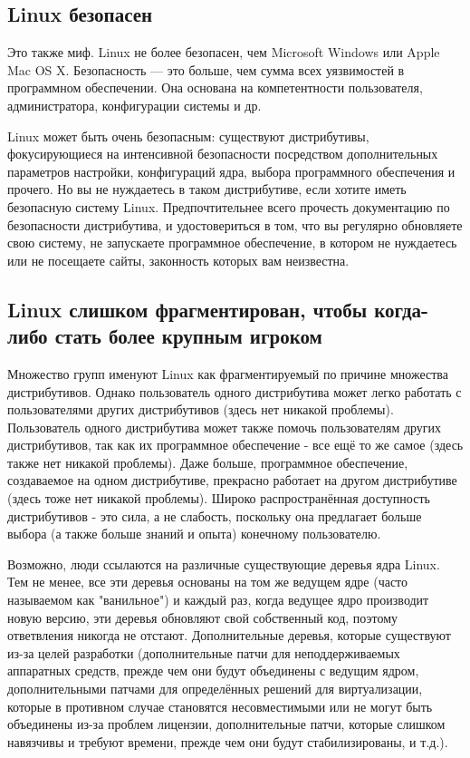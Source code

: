 \documentclass[12pt]{book}
\begin{document}
\subsection{Linux безопасен}

Это также миф. Linux не более безопасен, чем Microsoft Windows или Apple Mac OS X. Безопасность — это больше, чем сумма всех уязвимостей в программном обеспечении. Она основана на компетентности пользователя, администратора, конфигурации системы и др.

Linux может быть очень безопасным: существуют дистрибутивы,  фокусирующиеся на интенсивной безопасности посредством дополнительных параметров настройки, конфигураций ядра, выбора программного обеспечения и прочего. Но вы не нуждаетесь в таком дистрибутиве, если хотите иметь безопасную систему Linux. Предпочтительнее всего прочесть документацию по безопасности дистрибутива, и удостовериться в том, что вы регулярно обновляете свою систему, не запускаете программное обеспечение, в котором не нуждаетесь или не посещаете сайты, законность которых вам неизвестна.

\subsection{Linux слишком фрагментирован, чтобы когда-либо стать более крупным игроком}

Множество групп именуют Linux как фрагментируемый по причине множества дистрибутивов. Однако пользователь одного дистрибутива может легко работать с пользователями других дистрибутивов (здесь нет никакой проблемы). Пользователь одного дистрибутива может также помочь пользователям других дистрибутивов, так как их программное обеспечение - все ещё то же самое (здесь также нет никакой проблемы). Даже больше, программное обеспечение, создаваемое на одном дистрибутиве, прекрасно работает на другом дистрибутиве (здесь тоже нет никакой проблемы). Широко распространённая доступность дистрибутивов - это сила, а не слабость, поскольку она предлагает больше выбора (а также больше знаний и опыта) конечному пользователю.

Возможно, люди ссылаются на различные существующие деревья ядра Linux. Тем не менее, все эти деревья основаны на том же ведущем ядре (часто называемом как "ванильное") и каждый раз, когда ведущее ядро производит новую версию, эти деревья обновляют свой собственный код, поэтому ответвления никогда не отстают. Дополнительные деревья, которые существуют из-за целей разработки (дополнительные патчи для неподдерживаемых аппаратных средств, прежде чем они будут объединены с ведущим ядром, дополнительными патчами для определённых решений для виртуализации, которые в противном случае становятся несовместимыми или не могут быть объединены из-за проблем лицензии, дополнительные патчи, которые слишком навязчивы и требуют времени, прежде чем они будут стабилизированы, и т.д.).
\end{document}
